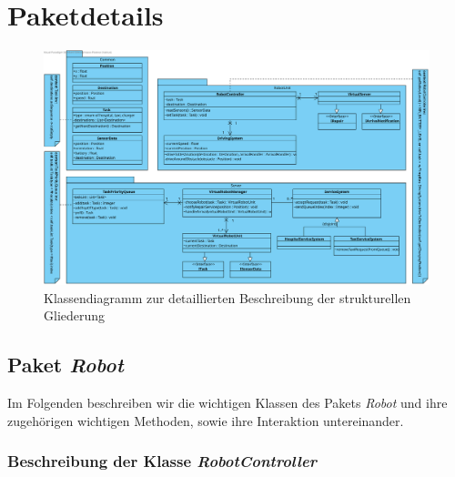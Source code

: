\section{Paketdetails}
\begin{figure}[H]
\centering
\includegraphics[height=0.95\linewidth, angle=90]{img/7-paketdetails}
\caption{Klassendiagramm zur detaillierten Beschreibung der strukturellen Gliederung}
\label{Paketdetails}
\end{figure}
\pagebreak

\subsection{Paket \textit{Robot}}
	Im Folgenden beschreiben wir die wichtigen Klassen des Pakets \textit{Robot} 
	und ihre zugehörigen wichtigen Methoden, sowie ihre Interaktion untereinander. 


	\subsubsection{Beschreibung der Klasse \textit{RobotController}}
		
